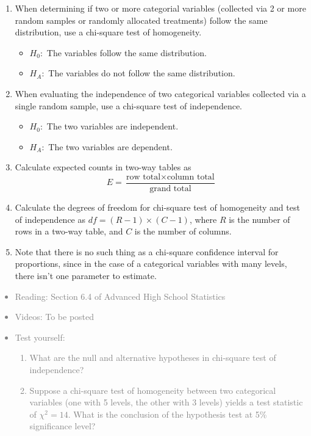 \documentclass[11pt]{article}
\newcommand{\gray}[1]{\textcolor{gray}{#1}}
\begin{document}
\begin{enumerate}[resume]
\renewcommand\labelenumi{\textcolor{light}{\textbf{LO \theenumi.}}}

\item When determining if two or more categorial variables (collected via 2 or more random samples or randomly allocated treatments) follow the same distribution, use a chi-square test of homogeneity.
\begin{itemize}
\item[] $H_0:$ The variables follow the same distribution.
\item[] $H_A:$ The variables do not follow the same distribution.
\end{itemize}

\item When evaluating the independence of two categorical variables collected via a single random sample, use a chi-square test of independence.
\begin{itemize}
\item[] $H_0:$ The two variables are independent.
\item[] $H_A:$ The two variables are dependent.
\end{itemize}

\item Calculate expected counts in two-way tables as 
\[ E = \frac{\text{row total} \times \text{column total}}{\text{grand total}} \]

\item Calculate the degrees of freedom for chi-square test of homogeneity and test of independence as $df = (R - 1) \times (C - 1)$, where $R$ is the number of rows in a two-way table, and $C$ is the number of columns.

\item Note that there is no such thing as a chi-square confidence interval for proportions, since in the case of a categorical variables with many levels, there isn't one parameter to estimate.

\end{enumerate}

\gray{
{\it
\vspace{-0.55cm}
\begin{itemize}
\renewcommand{\labelitemi}{{\textcolor{dark}{$\ast$}}}
\item Reading: Section 6.4 of Advanced High School Statistics
\item Videos: To be posted
\item Test yourself:
\begin{enumerate}
\item What are the null and alternative hypotheses in chi-square test of independence?
\item Suppose a chi-square test of homogeneity between two categorical variables (one with 5 levels, the other with 3 levels) yields a test statistic of $\chi^2 = 14$. What is the conclusion of the hypothesis test at 5\% significance level?
\end{enumerate}
\end{itemize}
}}
\end{document}
